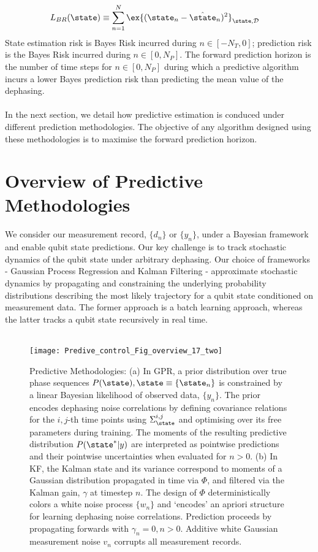 \begin{align}
L_{BR}(\state) & \equiv \sum_{n=1}^{N}\ex{(\state_n - \hat{\state}_n)^2}_{\state,\mathcal{D}} \label{eqn:sec:ap_opt_LossBR}
\end{align}
State estimation risk is Bayes Risk incurred during $n \in [-N_T, 0]$; prediction risk is the Bayes Risk incurred during $n \in [0, N_P]$. The forward prediction horizon is the number of time steps for $ n \in [0, N_P]$ during which a predictive algorithm incurs a lower Bayes prediction risk than predicting the mean value of the dephasing.
\\
\\
In the next section, we detail how predictive estimation is conduced under different prediction methodologies. The objective of any algorithm designed using these methodologies is  to maximise the forward prediction horizon. 

\section{Overview of Predictive Methodologies \label{sec:main:OverviewofPredictive Methodologies}}

We consider our measurement record,  $\{d_n\}$ or $\{y_n\}$, under a Bayesian framework and enable qubit state predictions. Our key challenge is to track stochastic dynamics of the qubit state under arbitrary dephasing. Our choice of frameworks - Gaussian Process Regression and Kalman Filtering - approximate stochastic dynamics by propagating and constraining the underlying probability distributions describing the most likely trajectory for a qubit state conditioned on measurement data. The former approach is a batch learning approach, whereas the latter tracks a qubit state recursively in real time. 
\\
\\
\begin{widetext}
\begin{figure*}
    \texttt{[image: Predive\_control\_Fig\_overview\_17\_two]} 
    \caption{ \label{fig:main:Predive_control_Fig_overview_17_two} Predictive Methodologies: (a) In GPR, a prior  distribution over true phase sequences $P(\state), \state \equiv \{ \state_n \}$ is constrained by a linear Bayesian likelihood of observed data, $\{ y_n\}$. The prior encodes dephasing noise correlations by defining covariance relations for the $i, j$-th time points using  $\Sigma_\state^{i, j}$ and optimising over its free parameters during training. The moments of the resulting predictive distribution $P(\state^*|y)$ are interpreted as pointwise predictions and their pointwise uncertainties when evaluated for $n>0$.  (b) In KF, the Kalman state and its variance correspond to moments of a Gaussian distribution propagated in time via $\Phi$, and filtered via the Kalman gain, $\gamma$ at timestep $n$. The design of $\Phi$ deterministically colors a white noise process $\{w_n \}$ and `encodes' an apriori structure for learning dephasing noise correlations. Prediction proceeds by propagating forwards with $\gamma_n=0, n>0$. Additive white Gaussian measurement noise $v_n$ corrupts all measurement records.}
\end{figure*}
\end{widetext}

